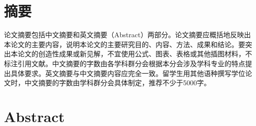 \maketitle%
\MAKETITLE%

\makedeclaration

\intobmk\chapter*{\texorpdfstring{摘\quad 要}{摘要}}
\setcounter{page}{1}
  
  论文摘要包括中文摘要和英文摘要（Abstract）两部分。论文摘要应概括地反映出本论文的主要内容，说明本论文的主要研究目的、内容、方法、成果和结论。要突出本论文的创造性成果或新见解，不宜使用公式、图表、表格或其他插图材料，不标注引用文献。中文摘要的字数由各学科群分会根据本分会涉及学科专业的特点提出具体要求。英文摘要与中文摘要内容应完全一致。留学生用其他语种撰写学位论文时，中文摘要的字数由学科群分会具体制定，推荐不少于5000字。





\intobmk\chapter*{Abstract}





